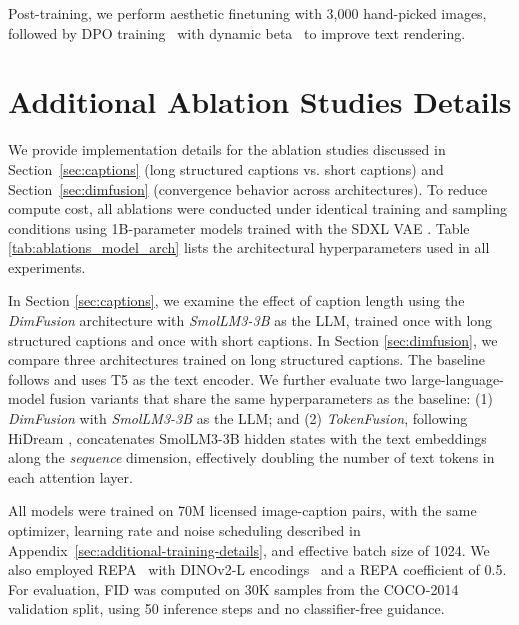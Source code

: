 \begin{appendices}
Post-training, we perform aesthetic finetuning with 3,000 hand-picked images, followed by DPO training~\cite{wallace2024diffusion} with dynamic beta~\cite{liu2025improving} to improve text rendering.





\section{Additional Ablation Studies Details}
\label{sec:appendix_ablation}

We provide implementation details for the ablation studies discussed in Section~\ref{sec:captions} (long structured captions vs. short captions) and Section~\ref{sec:dimfusion} (convergence behavior across architectures).
To reduce compute cost, all ablations were conducted under identical training and sampling conditions using 1B-parameter models trained with the SDXL VAE \cite{podell2023sdxl}.
Table \ref{tab:ablations_model_arch} lists the architectural hyperparameters used in all experiments.


In Section \ref{sec:captions}, we examine the effect of caption length using the \emph{DimFusion} architecture with \emph{SmolLM3-3B} as the LLM, trained once with long structured captions and once with short captions.
In Section \ref{sec:dimfusion}, we compare three architectures trained on long structured captions.
The baseline follows \cite{esser2024scaling} and uses T5 \cite{raffel2020exploring} as the text encoder.
We further evaluate two large-language-model fusion variants that share the same hyperparameters as the baseline:
(1) \emph{DimFusion} with \emph{SmolLM3-3B} as the LLM; and
(2) \emph{TokenFusion}, following HiDream \cite{cai2025hidream}, concatenates SmolLM3-3B hidden states with the text embeddings along the \emph{sequence} dimension, effectively doubling the number of text tokens in each attention layer.

All models were trained on 70M licensed image-caption pairs, with the same optimizer, learning rate and noise scheduling described in Appendix~\ref{sec:additional-training-details}, and effective batch size of 1024. We also employed REPA~\cite{yu2024representation} with DINOv2-L encodings~\cite{oquab2023dinov2} and a REPA coefficient of 0.5.
For evaluation, FID was computed on 30K samples from the COCO-2014~\cite{lin2014microsoft} validation split, using 50 inference steps and no classifier-free guidance.



\end{appendices}
